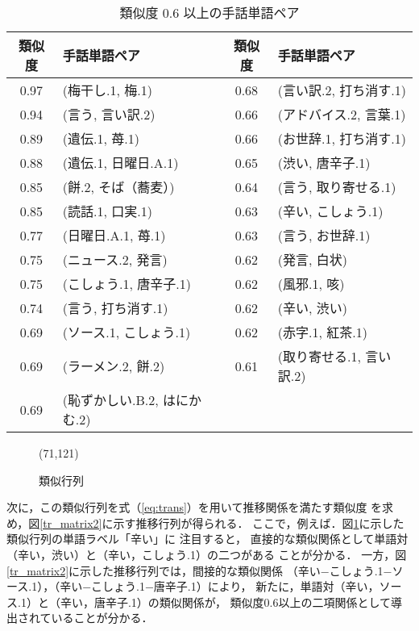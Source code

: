 \begin{table}[htb]
\caption{類似度 $0.6$ 以上の手話単語ペア}
\label{sim_kekka}
\tabcolsep=3pt\footnotesize
\begin{center}
\begin{tabular}{c|l||c|l}\hline
類似度 & 手話単語ペア & 類似度 & 手話単語ペア \\ \hline\hline
0.97 &(梅干し.1, 梅.1) & 0.68 & (言い訳.2, 打ち消す.1) \\ \hline
0.94 &(言う, 言い訳.2) & 0.66 & (アドバイス.2, 言葉.1) \\ \hline
0.89 &(遺伝.1, 苺.1)   & 0.66 & (お世辞.1, 打ち消す.1) \\ \hline
0.88 &(遺伝.1, 日曜日.A.1) & 0.65 & (渋い, 唐辛子.1) \\ \hline
0.85 &(餅.2, そば（蕎麦）) & 0.64 & (言う, 取り寄せる.1) \\ \hline
0.85 &(読話.1, 口実.1) & 0.63 & (辛い, こしょう.1) \\ \hline
0.77 &(日曜日.A.1, 苺.1) & 0.63 & (言う, お世辞.1) \\
0.75 &(ニュース.2, 発言) & 0.62 & (発言, 白状) \\ \hline
0.75 &(こしょう.1, 唐辛子.1)& 0.62 & (風邪.1, 咳) \\ \hline
0.74 &(言う, 打ち消す.1) & 0.62 & (辛い, 渋い) \\ \hline
0.69 &(ソース.1, こしょう.1) & 0.62 & (赤字.1, 紅茶.1) \\ \hline
0.69 &(ラーメン.2, 餅.2) & 0.61 & (取り寄せる.1, 言い訳.2) \\ \hline
0.69 &(恥ずかしい.B.2, はにかむ.2) & & \\ \hline
\end{tabular}
\end{center}
\end{table}

\begin{figure}[htb]
\begin{center}
\atari(71,121)
\end{center}
\caption{類似行列}
\label{s_matrix1}
\end{figure}

次に，この類似行列を式（\ref{eq:trans}）を用いて推移関係を満たす類似度
を求め，図\ref{tr_matrix2}に示す推移行列が得られる．
ここで，例えば．図\ref{s_matrix1}に示した類似行列の単語ラベル「辛い」に
注目すると，
直接的な類似関係として単語対（辛い，渋い）と（辛い，こしょう.1）の二つがある
ことが分かる．
一方，図\ref{tr_matrix2}に示した推移行列では，間接的な類似関係
（辛い−こしょう.1−ソース.1），（辛い−こしょう.1−唐辛子.1）により，
新たに，単語対（辛い，ソース.1）と（辛い，唐辛子.1）の類似関係が，
類似度$0.6$以上の二項関係として導出されていることが分かる．

